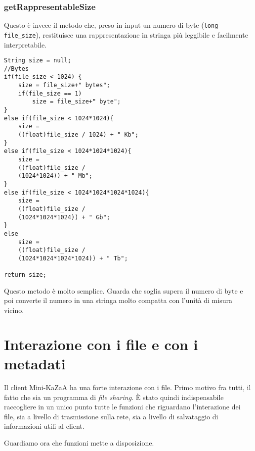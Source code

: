 \subsubsection{getRappresentableSize}
Questo è invece il metodo che, preso in input un numero di byte (\verb|long file_size|), restituisce una rappresentazione in stringa più leggibile e facilmente interpretabile.
\begin{lstlisting}
String size = null;
//Bytes
if(file_size < 1024) {
	size = file_size+" bytes";
	if(file_size == 1)
		size = file_size+" byte";
}
else if(file_size < 1024*1024){
	size = 
	((float)file_size / 1024) + " Kb";
}
else if(file_size < 1024*1024*1024){
	size = 
	((float)file_size /
	(1024*1024)) + " Mb";
}
else if(file_size < 1024*1024*1024*1024){
	size = 
	((float)file_size / 
	(1024*1024*1024)) + " Gb";
}
else
	size = 
	((float)file_size / 
	(1024*1024*1024*1024)) + " Tb";

return size;
\end{lstlisting}
Questo metodo è molto semplice. Guarda che soglia supera il numero di byte e poi converte il numero in una stringa molto compatta con l'unità di misura vicino.

\section{Interazione con i file e con i metadati}
Il client Mini-KaZaA ha una forte interazione con i file. Primo motivo fra tutti, il fatto che sia un programma di \emph{file sharing}.
\`{E} stato quindi indispensabile raccogliere in un unico punto tutte le funzioni che riguardano l'interazione dei file, sia a livello di trasmissione sulla rete, sia a livello di salvataggio di informazioni utili al client.

Guardiamo ora che funzioni mette a disposizione.
